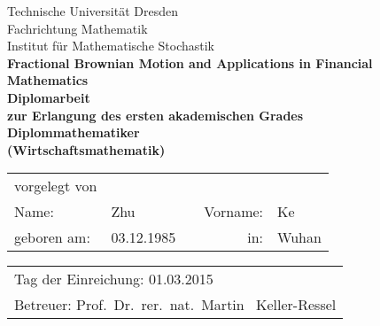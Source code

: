 \begin{titlepage}
	\begin{center}
		\Huge
		Technische Universit\"at Dresden \\[-.4em]
		Fachrichtung Mathematik \\[.5em]
		\Large
		Institut f\"ur Mathematische Stochastik \\[4em]
		\bfseries\huge
		 Fractional Brownian Motion and Applications in Financial Mathematics \\[3em]
		\normalfont\Large
		Diplomarbeit \\
		zur Erlangung des ersten akademischen Grades \\[.5em]
		\bfseries\Large
		Diplommathematiker\\[.5em]
	  	\bfseries\Large
		(Wirtschaftsmathematik)\\[4em]
	\end{center}
	\large
	\begin{tabular}{lllrl}
		vorgelegt von & & & & \\[1.2em]
		Name: & Zhu & \hspace{1.5cm} & Vorname: & Ke \\[.5em]
		geboren am: & 03.12.1985 & & in: & Wuhan \\[3em]
	\end{tabular}
	\newline
	\begin{tabular}{l}
		Tag der Einreichung: \hspace{.5cm} 01.03.2015 \\[.5em]
		Betreuer: \hspace{.5cm} Prof.~Dr.~rer.~nat.~Martin ~Keller-Ressel
	\end{tabular}
\end{titlepage}
\thispagestyle{empty}
\mbox{}
